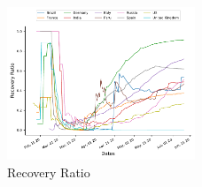 \documentclass[12pt, twosided]{report}  %
\begin{document}
\begin{figure}[H]
	\centering
	\includegraphics[width=0.5\textwidth]{./images/plot_6.pdf}
	\caption{Recovery Ratio}
	\label{plot_2}
\end{figure}
\end{document}
